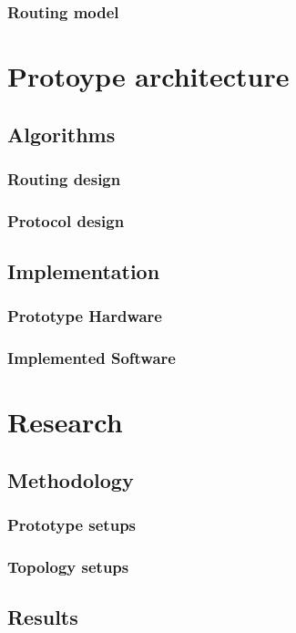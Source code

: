 \documentclass[pointlessnumbers, abstracton, headsepline, a4paper]{scrartcl}
\begin{document}
\subsubsection{Routing model}

\section{Protoype architecture}
\subsection{Algorithms}
\subsubsection{Routing design}
\subsubsection{Protocol design}

\subsection{Implementation}
\subsubsection{Prototype Hardware}
\subsubsection{Implemented Software}

\clearpage
\section{Research}

\subsection{Methodology}
\subsubsection{Prototype setups}
\subsubsection{Topology setups}

\subsection{Results}
\end{document}
